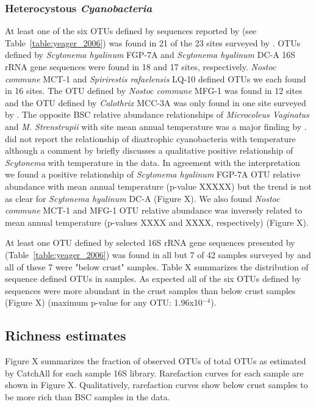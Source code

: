 \subsubsection{Heterocystous \textit{Cyanobacteria}}
At least one of the six OTUs defined by sequences reported by \citet{Yeager} (see Table~\ref{table:yeager_2006}) was found in 21 of the 23 sites surveyed by \citet{Garcia_Pichel_2013}. OTUs defined by \textit{Scytonema hyalinum} FGP-7A and \textit{Scytonema hyalinum} DC-A 16S rRNA gene sequences were found in 18 and 17 sites, respectively. \textit{Nostoc commune} MCT-1 and \textit{Spirirestis rafaelensis} LQ-10 defined OTUs we each found in 16 sites. The OTU defined by \textit{Nostoc commune} MFG-1 was found in 12 sites and the OTU defined by \textit{Calothrix} MCC-3A was only found in one site surveyed by \citet{Garcia_Pichel_2013}. The opposite BSC relative abundance relationships of \textit{Microcoleus Vaginatus} and \textit{M. Strenstrupii} with site mean annual temperature was a major finding by \citet{Garcia_Pichel_2013}. \citet{Garcia_Pichel_2013} did not report the relationship of diaztrophic cyanobacteria with temperature although a comment by \citet{Belnap28062013} briefly discusses a qualitative positive relationship of \textit{Scytonema} with temperature in the \citet{Garcia_Pichel_2013} data. In agreement with the \citet{Belnap28062013} interpretation we found a positive relationship of \textit{Scytonema hyalinum} FGP-7A OTU relative abundance with mean annual temperature (p-value XXXXX) but the trend is not as clear for \textit{Scytonema hyalinum} DC-A (Figure X). We also found \textit{Nostoc commune} MCT-1 and MFG-1 OTU relative abundance was inversely related to mean annual temperature (p-values XXXX and XXXX, respectively) (Figure X). 

At least one OTU defined by selected 16S rRNA gene sequences presented by \citet{Yeager} (Table~\ref{table:yeager_2006}) was found in all but 7 of 42 samples surveyed by \citet{Steven_2013} and all of these 7 were "below crust" samples. Table X summarizes the distribution of \citet{Yeager} sequence defined OTUs in \citet{Steven_2013} samples. As expected all of the six OTUs defined by \citet{Yeager} sequences were more abundant in the crust samples than below crust samples (Figure X) (maximum p-value for any OTU: 1.96x10$^{-4}$).

\subsection{Richness estimates}
Figure X summarizes the fraction of observed OTUs of total OTUs as estimated by CatchAll for each sample 16S library. Rarefaction curves for each sample are shown in Figure X. Qualitatively, rarefaction curves show below crust samples to be more rich than BSC samples in the \citet{Steven_2013} data.